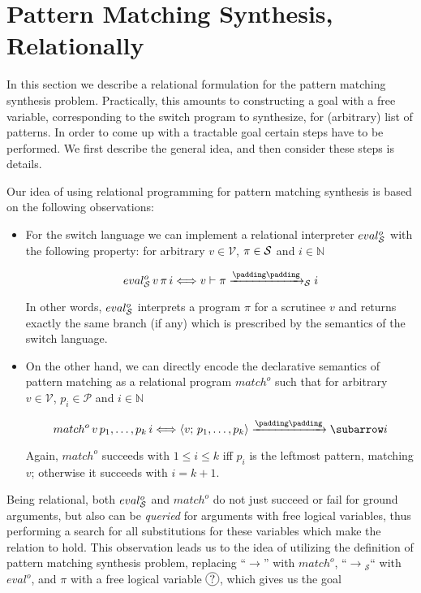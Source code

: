 \section{Pattern Matching Synthesis, Relationally}

In this section we describe a relational formulation for the pattern matching synthesis problem. Practically,
this amounts to constructing a goal with a free variable, corresponding to the switch program to synthesize,
for (arbitrary) list of patterns. In order to come up with a tractable goal certain steps have to be performed.
We first describe the general idea, and then consider these steps is details.

Our idea of using relational programming for pattern matching synthesis is based on the following observations:

\begin{itemize}
\item For the switch language we can implement a relational interpreter $eval^o_{\mathcal{S}}$ with the following property: for
  arbitrary $v\in\mathcal V$, $\pi\in\mathcal{S}$ and $i\in\mathbb N$
 
  \[
  \setarrow{\xrightarrow}
  \setsubarrow{_\ir}
   eval^o_\ir\, v\, \pi\, i \Longleftrightarrow \withenv{v}{\trans{\pi}{}{i}}
  \]

  In other words, $eval^o_{\mathcal{S}}$ interprets a program $\pi$ for a scrutinee $v$ and returns exactly the same branch (if any)
  which is prescribed by the semantics of the switch language. 
  
\item On the other hand, we can directly encode the declarative semantics of pattern matching as a relational
  program $match^o$ such that for arbitrary $v\in\mathcal V$, $p_i\in\mathcal P$ and $i\in\mathbb N$

  \[
  \setarrow{\xrightarrow}
  match^o\,v\,p_1,\dots,p_k\,i \Longleftrightarrow \trans{\inbr{v;\,p_1,\dots,p_k}}{}{i}
  \]

  Again, $match^o$ succeeds with $1\le i\le k$ iff $p_i$ is the leftmost pattern, matching $v$; otherwise it
  succeeds with $i=k+1$.
\end{itemize}

Being relational, both $eval^o_{\mathcal{S}}$ and $match^o$ do not just succeed or fail for ground arguments, but also can be \emph{queried} for
arguments with free logical variables, thus performing a search for all substitutions for these variables which make the
relation to hold. This observation leads us to the idea of utilizing the definition of pattern matching
synthesis problem, replacing ``$\xrightarrow{}{}$'' with $match^o$, ``$\xrightarrow{}{}_{\mathcal S}$`` with $eval^o$,
and $\pi$ with a free logical variable $\circled{?}$, which gives us the goal

